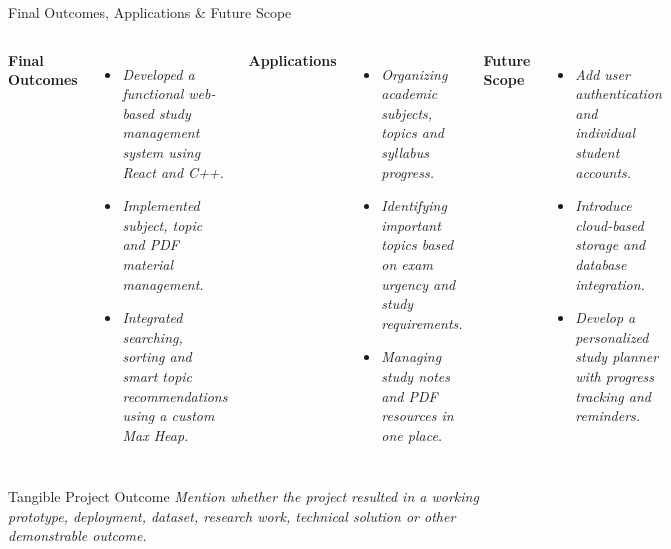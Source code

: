 \documentclass[aspectratio=169,11pt]{beamer}
\newcommand{\placeholder}[1]{%
\textit{\color{GEUGrey}#1}
}
\begin{document}
\begin{frame}{Final Outcomes, Applications \& Future Scope}

\begin{columns}[T,totalwidth=\textwidth]

\vspace{-0.7cm}
\textbf{\color{GEUBlue}Final Outcomes}

\begin{itemize}\itemsep3pt
    \item \placeholder{Developed a functional web-based study management system using React and C++.
}
    \item \placeholder{Implemented subject, topic and PDF material management.}
    \item \placeholder{Integrated searching, sorting and smart topic recommendations using a custom Max Heap.}
\end{itemize}

\vspace{-0.7cm}
\textbf{\color{GEUBlue}Applications}

\begin{itemize}\itemsep3pt
    \item \placeholder{Organizing academic subjects, topics and syllabus progress.
}
    \item \placeholder{Identifying important topics based on exam urgency and study requirements.}
    \item \placeholder{Managing study notes and PDF resources in one place.}
\end{itemize}

\vspace{-0.7cm}
\textbf{\color{GEUBlue}Future Scope}

\begin{itemize}\itemsep3pt
    \item \placeholder{Add user authentication and individual student accounts.}
    \item \placeholder{Introduce cloud-based storage and database integration.}
    \item \placeholder{Develop a personalized study planner with progress tracking and reminders.
}
\end{itemize}

\end{columns}

\vspace{5mm}

\begin{block}{Tangible Project Outcome}
\placeholder{
Mention whether the project resulted in a working prototype,
deployment, dataset, research work, technical solution or other
demonstrable outcome.
}
\end{block}

\end{frame}
\end{document}
